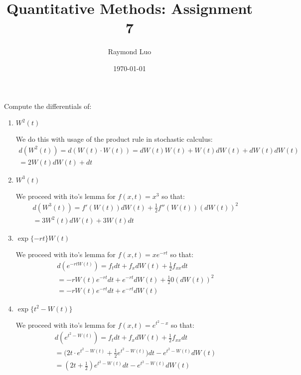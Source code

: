 \documentclass[12pt,twoside, letter]{exam}
\theoremstyle{definition}
\begin{document}
\abovedisplayskip=12pt
\belowdisplayskip=12pt
\abovedisplayshortskip=7pt
\belowdisplayshortskip=10pt
\allowdisplaybreaks

\setlength{\parindent}{18pt}

\title{Quantitative Methods: Assignment 7}
\author{Raymond Luo}
\date{\today}
\maketitle


  \par{Compute the differentials of:}

  \begin{enumerate}
    \item $W^2(t)$
      \begin{solution}
        We do this with usage of the product rule in stochastic calculus:
        \begin{align*}
          d(W^2(t)) = d(W(t)\cdot W(t)) = dW(t)W(t) + W(t)dW(t) + dW(t)dW(t) \\
          = 2W(t) dW(t) + dt
        \end{align*}
      \end{solution}
    \item $W^3(t)$
      \begin{solution}
        We proceed with ito's lemma for $f(x,t) = x^3$ so that:
        \begin{align*}
          d(W^3(t)) = f'(W(t)) dW(t) + \frac{1}{2} f''(W(t)) (dW(t))^2 \\
          = 3W^2(t) dW(t)  + 3W(t) dt
        \end{align*}
      \end{solution}
    \item $\exp{\{-rt\}}W(t)$
      \begin{solution}
        We proceed with ito's lemma for $f(x,t) = xe^{-rt}$ so that:
        \begin{align*}
          d(e^{-rtW(t)}) = f_{t} dt + f_{x} dW(t) + \frac{1}{2} f_{xx} dt \\
          = -rW(t)e^{-rt} dt + e^{-rt} dW(t) + \frac{1}{2} 0 (dW(t))^2 \\
          = -rW(t)e^{-rt} dt + e^{-rt} dW(t)
        \end{align*}
      \end{solution}
    \item $\exp{\{t^2 - W(t)\}}$
      \begin{solution}
        We proceed with ito's lemma for $f(x,t) = e^{t^2 - x}$ so that:
        \begin{align*}
          d(e^{t^2 - W(t)}) = f_{t} dt + f_{x} dW(t) + \frac{1}{2} f_{xx} dt \\
          = \big(2t\cdot e^{t^2 - W(t)} + \frac{1}{2}e^{t^2 - W(t)} \big)dt
          - e^{t^2 - W(t)} dW(t) \\
          = (2t + \frac{1}{2})e^{t^2 - W(t)} dt - e^{t^2 - W(t)} dW(t)
        \end{align*}
      \end{solution}
  \end{enumerate}
\end{document}
